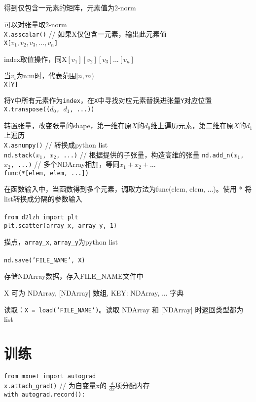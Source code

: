 \documentclass[UTF8]{ctexart}
\begin{document}
  得到仅包含一元素的矩阵，元素值为2-norm

  可以对张量取2-norm\\
\texttt{X.asscalar()} // 如果X仅包含一元素，输出此元素值\\
\texttt{X[$v_1, v_2, v_3, ..., v_n$]}

  index取值操作，同X$[v_1][v_2][v_3]...[v_n]$

  当$v_i$为n:m时，代表范围$[n, m)$\\
\texttt{X[Y]}

  将\texttt{Y}中所有元素作为\texttt{index}，在\texttt{X}中寻找对应元素替换进张量\texttt{Y}对应位置\\
\texttt{X.transpose(($d_0$, $d_1$, ...))}

  转置张量，改变张量的shape，第一维在原$X$的$d_0$维上遍历元素，第二维在原$X$的$d_1$上遍历\\
\texttt{X.asnumpy()} // 转换成python list\\
\texttt{nd.stack($x_1$, $x_2$, ...)} // 根据提供的子张量，构造高维的张量
\texttt{nd.add\_n($x_1$, $x_2$, ...)} // 多个NDArray相加，等同$x_1 + x_2 + ...$\\
\texttt{func(*[elem, elem, ...])}

  在函数输入中，当函数得到多个元素，调取方法为func(elem, elem, ...)。使用 * 将list转换成分隔的参数输入\\\\
\texttt{from d2lzh import plt}\\
\texttt{plt.scatter(array\_x, array\_y, 1)}

  描点，\texttt{array\_x}, \texttt{array\_y}为python list\\\\
\texttt{nd.save('FILE\_NAME', X)}

  存储NDArray数据，存入FILE\_NAME文件中

  X 可为 NDArray, [NDArray] 数组, {KEY: NDArray, ...} 字典
  
  读取：\texttt{X = load('FILE\_NAME')}。读取 NDArray 和 [NDArray] 时返回类型都为list

\section{训练}

\noindent \texttt{from mxnet import autograd}\\
\texttt{x.attach\_grad()} // 为自变量x的 $\frac{d }{d x} $项分配内存\\
\texttt{with autograd.record():}
\end{document}
